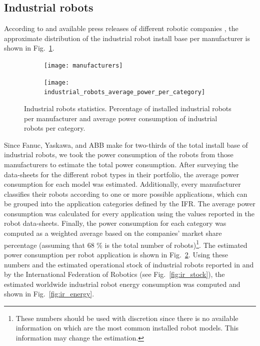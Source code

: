 \subsection{Industrial robots}
According to \cite{montaqim2015} and available press releases of different robotic companies \cite{fanuc2015, yaskawa2014, ABB2015}, the approximate distribution of the industrial robot install base per manufacturer is shown in Fig.~\ref{fig:manufacturers_pie}.
\begin{figure}[!h]
	\centering
	\hspace*{\fill}
	\begin{subfigure}[t]{0.45\textwidth}
		\subcaption{}
		\texttt{[image: manufacturers]}
		\label{fig:manufacturers_pie}
	\end{subfigure}
	\hfill
	\begin{subfigure}[t]{0.45\textwidth}
		\subcaption{}
		\texttt{[image: industrial\_robots\_average\_power\_per\_category]} \label{fig:ir_average_power}
	\end{subfigure}
	\hspace*{\fill}
	\caption[] {\label{fig:ir_statistics} Industrial robots statistics.  Percentage of installed industrial robots per manufacturer and  average power consumption of industrial robots per category.}
\end{figure}

Since Fanuc, Yaskawa, and ABB make for two-thirds of the total install base of industrial robots, we took the power consumption of the robots from those manufacturers to estimate the total power consumption. After surveying the data-sheets for the different robot types in their portfolio, the average power consumption for each model was estimated. Additionally, every manufacturer classifies their robots according to one or more possible applications, which can be grouped into the application categories defined by the IFR. The average power consumption was calculated for every application using the values reported in the robot data-sheets. Finally, the power consumption for each category was computed as a weighted average based on the companies' market share percentage (assuming that 68 \% is the total number of robots)\footnote[1]{These numbers should be used with discretion since there is no available information on which are the most common installed robot models. This information may change the estimation.}. The estimated power consumption per robot application is shown in Fig.~\ref{fig:ir_average_power}. Using these numbers and the estimated operational stock of industrial robots reported in \cite{statista_ir_operational_stock} and by the International Federation of Robotics (see Fig.~\ref{fig:ir_stock}), the estimated worldwide industrial robot energy consumption was computed and shown in Fig.~\ref{fig:ir_energy}.

